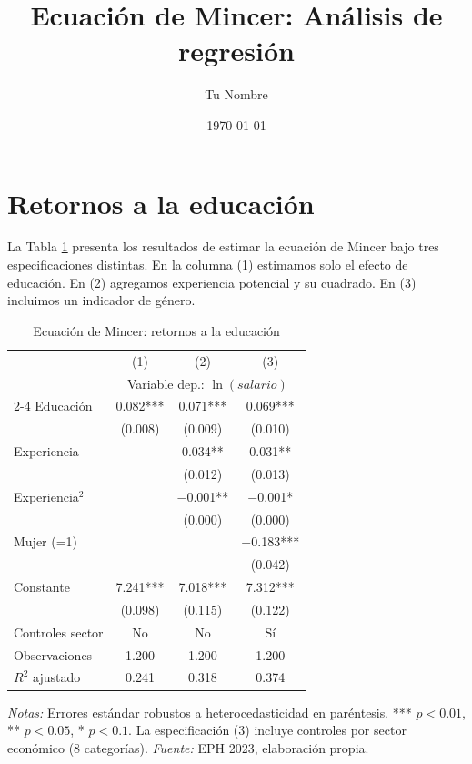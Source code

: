\documentclass[12pt, a4paper]{article}
\title{Ecuación de Mincer: Análisis de regresión}
\author{Tu Nombre}
\date{\today}
\begin{document}
\maketitle

\section{Retornos a la educación}

La Tabla \ref{tab:mincer} presenta los resultados de estimar la ecuación de 
Mincer bajo tres especificaciones distintas. En la columna (1) estimamos solo 
el efecto de educación. En (2) agregamos experiencia potencial y su cuadrado. 
En (3) incluimos un indicador de género.

\begin{table}[htbp]
  \centering
  \caption{Ecuación de Mincer: retornos a la educación}
  \label{tab:mincer}
  \begin{tabular}{lccc}
    \toprule
                         & (1)        & (2)        & (3)       \\
                         & \multicolumn{3}{c}{Variable dep.: $\ln(salario)$} \\
    \cmidrule(lr){2-4}
    \midrule
    Educación            & 0.082***   & 0.071***   & 0.069***  \\
                         & (0.008)    & (0.009)    & (0.010)   \\[5pt]
    Experiencia          &            & 0.034**    & 0.031**   \\
                         &            & (0.012)    & (0.013)   \\[5pt]
    Experiencia$^2$      &            & $-$0.001** & $-$0.001* \\
                         &            & (0.000)    & (0.000)   \\[5pt]
    Mujer (=1)           &            &            & $-$0.183*** \\
                         &            &            & (0.042)   \\[5pt]
    Constante            & 7.241***   & 7.018***   & 7.312***  \\
                         & (0.098)    & (0.115)    & (0.122)   \\
    \midrule
    Controles sector     & No         & No         & Sí        \\
    Observaciones        & 1.200      & 1.200      & 1.200     \\
    $R^2$ ajustado       & 0.241      & 0.318      & 0.374     \\
    \bottomrule
  \end{tabular}
  \begin{minipage}{\linewidth}
    \footnotesize \textit{Notas:} Errores estándar robustos a heterocedasticidad 
    en paréntesis. *** $p<0.01$, ** $p<0.05$, * $p<0.1$. La especificación 
    (3) incluye controles por sector económico (8 categorías). 
    \textit{Fuente:} EPH 2023, elaboración propia.
  \end{minipage}
\end{table}
\end{document}
